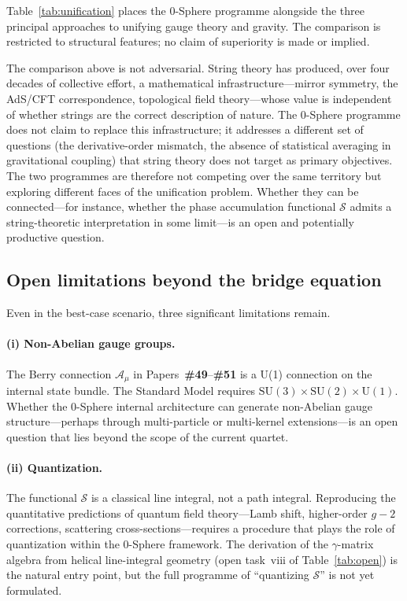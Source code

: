 \documentclass[12pt,letterpaper]{article}
\newcommand{\paperno}[1]{\textbf{\#{}#1}}
\newcommand{\calS}{\mathcal{S}}
\newcommand{\calA}{\mathcal{A}}
\begin{document}
Table~\ref{tab:unification} places the 0-Sphere programme alongside
the three principal approaches to unifying gauge theory and gravity.
The comparison is restricted to structural features; no claim of
superiority is made or implied.


\noindent The comparison above is not adversarial.
String theory has produced, over four decades of collective effort,
a mathematical infrastructure---mirror symmetry, the AdS/CFT correspondence,
topological field theory---whose value is independent of whether strings are
the correct description of nature.
The 0-Sphere programme does not claim to replace this infrastructure;
it addresses a different set of questions
(the derivative-order mismatch, the absence of statistical averaging
in gravitational coupling) that string theory does not target as primary
objectives.
The two programmes are therefore not competing over the same territory
but exploring different faces of the unification problem.
Whether they can be connected---for instance, whether the phase accumulation
functional $\calS$ admits a string-theoretic interpretation in some limit---is
an open and potentially productive question.

\subsection{Open limitations beyond the bridge equation}
\label{subsec:limitations}

Even in the best-case scenario, three significant limitations remain.

\paragraph{(i) Non-Abelian gauge groups.}
The Berry connection $\calA_\mu$ in Papers~\paperno{49}--\paperno{51}
is a U(1) connection on the internal state bundle.
The Standard Model requires
$\mathrm{SU}(3)\times\mathrm{SU}(2)\times\mathrm{U}(1)$.
Whether the 0-Sphere internal architecture can generate non-Abelian
gauge structure---perhaps through multi-particle or multi-kernel
extensions---is an open question that lies beyond the scope of the
current quartet.

\paragraph{(ii) Quantization.}
The functional $\calS$ is a classical line integral, not a path integral.
Reproducing the quantitative predictions of quantum field theory---Lamb shift,
higher-order $g-2$ corrections, scattering cross-sections---requires a
procedure that plays the role of quantization within the 0-Sphere framework.
The derivation of the $\gamma$-matrix algebra from helical line-integral
geometry (open task~viii of Table~\ref{tab:open}) is the natural entry point,
but the full programme of ``quantizing $\calS$'' is not yet formulated.
\end{document}
